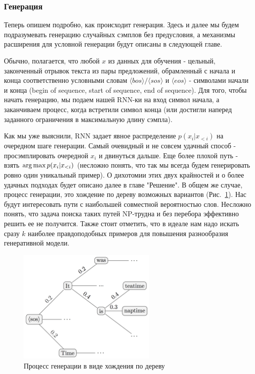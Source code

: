 \documentclass{spbau-diploma}
\begin{document}
\subsubsection{Генерация}
Теперь опишем подробно, как происходит генерация. Здесь и далее мы будем 
подразумевать генерацию случайных сэмплов без предусловия, а механизмы 
расширения для условной генерации будут описаны в следующей главе.

\newcommand{\bos}{\langle bos \rangle}
\newcommand{\sos}{\langle sos \rangle}
\newcommand{\eos}{\langle eos \rangle}
\newcommand{\unk}{\langle unk \rangle}
\newcommand{\pad}{\langle pad \rangle}
Обычно, полагается, что любой $x$ из данных для обучения - цельный, законченный 
отрывок текста из пары предложений, обрамленный с начала и конца соответственно 
условными словам $\bos/\sos$ и $\eos$ - символами начали и конца (begin of 
sequence, start of sequence, end of sequence). Для того, чтобы начать генерацию, 
мы подаем нашей RNN-ки на вход символ начала, а заканчиваем процесс, когда 
встретили символ конца (или достигли наперед заданного ограничения в 
максимальную длину сэмпла).

Как мы уже выяснили, RNN задает явное распределение $p(x_i|x_{<i})$ на очередном
шаге генерации. Самый очевидный и не совсем удачный способ - просэмплировать
очередной $x_i$ и двинуться дальше. Еще более плохой путь - взять 
$\operatorname*{arg\,max} p(x_i|x_{<i})$ (несложно понять, что так мы всегда будем 
генерировать ровно один уникальный пример). О дихотомии этих двух крайностей и 
о более удачных подходах будет описано далее в главе "Решение". В общем же 
случае, процесс генерации, это хождение по дереву возможных вариантов
(Рис.~\ref{beam_search}). Нас будут интересовать пути с наибольшей совместной 
вероятностью слов. Несложно понять, что задача поиска таких путей NP-трудна и 
без перебора эффективно решить ее не получится. Также стоит отметить, что в 
идеале нам надо искать сразу $k$ наиболее правдоподобных примеров для повышения
разнообразия генеративной модели.

\begin{figure}[h]
\centering
\includegraphics[width=0.6\textwidth]{images/beam_search.png}
\caption{Процесс генерации в виде хождения по дереву}
\label{beam_search}
\end{figure}
\end{document}
